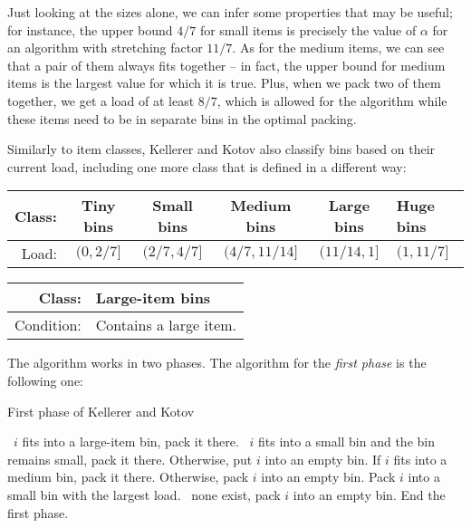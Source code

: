 Just looking at the sizes alone, we can infer some properties that may
be useful; for instance, the upper bound $4/7$ for small items is
precisely the value of $\alpha$ for an algorithm with stretching
factor $11/7$. As for the medium items, we can see that a pair of them
always fits together -- in fact, the upper bound for medium items is
the largest value for which it is true. Plus, when we pack two of them
together, we get a load of at least $8/7$, which is allowed for the
algorithm while these items need to be in separate bins in the optimal
packing.


Similarly to item classes, Kellerer and Kotov also classify bins based
on their current load, including one more class that is defined in a
different way:

\begin{center}
  \begin{tabular}{ r | c | c | c | c | l }
    Class: & Tiny bins & Small bins & Medium bins & Large bins & Huge bins \\ \hline
    Load:  & $(0,2/7]$ & $(2/7, 4/7]$ & $(4/7, 11/14]$ & $(11/14,1]$ & $(1,11/7]$ \\ 
  \end{tabular}
\end{center}

\begin{center}
  \begin{tabular}{ r | l }
    Class: & Large-item bins \\ \hline
    Condition: & Contains a large item. \\ 
  \end{tabular}
\end{center}


The algorithm works in two phases. The algorithm for the \emph{first
phase} is the following one:

\begin{algorithm}
\caption{First phase of Kellerer and Kotov}
\begin{algorithmic}[1]
\State \algorithmicif\ $i$ fits into a large-item bin, pack it there.
\State \algorithmicif\ $i$ fits into a small bin and the bin remains small, pack it there.
\State Otherwise, put $i$ into an empty bin.
\EndIf
{}
\State If $i$ fits into a medium bin, pack it there.
\State Otherwise, pack $i$ into an empty bin.
\EndIf
{}
\State Pack $i$ into a small bin with the largest load.
\State \algorithmicif\ none exist, pack $i$ into an empty bin.
\EndIf
{}
\State End the first phase.
\EndIf
\EndFor 
\end{algorithmic}
\end{algorithm}

